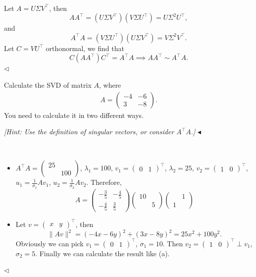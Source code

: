 ﻿\documentclass[11pt]{article}
\newenvironment{problem}[2][Problem]{\begin{trivlist}
\item[\hskip \labelsep {\bfseries #1}\hskip \labelsep {\bfseries #2.}]}{\hfill$\blacktriangleleft$\end{trivlist}}
\newenvironment{answer}[1][Answer]{\begin{trivlist}
\item[\hskip \labelsep {\bfseries #1.}\hskip \labelsep]}{\hfill$\lhd$\end{trivlist}}
\begin{document}
\begin{answer} ~

    Let $A=U\Sigma V^\intercal$, then
    $$
        AA^\intercal = (U\Sigma V^\intercal)(V\Sigma U^\intercal) = U\Sigma^2 U^\intercal,
    $$
    and
    $$
        A^\intercal A = (V\Sigma U^\intercal)(U\Sigma V^\intercal) = V\Sigma^2 V^\intercal.
    $$
    Let $C=VU^\intercal$ orthonormal, we find that
    $$
        C(AA^\intercal)C^\intercal = A^\intercal A\implies AA^\intercal \sim A^\intercal A.
    $$
\end{answer}

\begin{problem}{4 (12')}
Calculate the SVD of matrix $A$, where 
\begin{align*}
    A=\begin{pmatrix}
        -4&-6\\3&-8
    \end{pmatrix}.
\end{align*} 
You need to calculate it in two different ways.

\textit{[Hint: Use the definition of singular vectors, or consider $A^\top A$.]}
\end{problem}

\begin{answer} ~
\begin{itemize}
    \item[(a)] $A^\intercal A=\begin{pmatrix}25\\&100\end{pmatrix}$, $\lambda_1=100$, $v_1=\begin{pmatrix}0&1\end{pmatrix}^\intercal$, $\lambda_2=25$, $v_2=\begin{pmatrix}1&0\end{pmatrix}^\intercal$, $u_1=\frac{1}{\sigma_1}Av_1$, $u_2=\frac{1}{\sigma_2}Av_2$. Therefore,
    $$
        A = \begin{pmatrix}
            -\frac{3}{5} & -\frac{4}{5}\\
            -\frac{4}{5} & \frac{3}{5}
        \end{pmatrix} \begin{pmatrix}
            10 \\ & 5
        \end{pmatrix} \begin{pmatrix}
            & 1\\ 1
        \end{pmatrix}
    $$
    \item[(b)] Let $v=\begin{pmatrix}x & y\end{pmatrix}^\intercal$, then
    $$
        \|Av\|^2=(-4x-6y)^2+(3x-8y)^2=25x^2+100y^2.
    $$
    Obviously we can pick $v_1=\begin{pmatrix}0&1\end{pmatrix}^\intercal$, $\sigma_1=10$. Then $v_2=\begin{pmatrix}1&0\end{pmatrix}^\intercal\perp v_1$, $\sigma_2=5$. Finally we can calculate the result like (a).
\end{itemize}
\end{answer}
\end{document}
